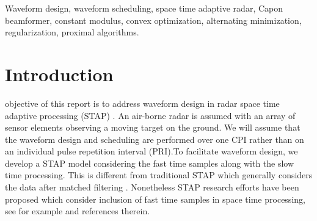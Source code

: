 \documentclass[11pt,draftclsnofoot,onecolumn]{IEEEtran}
\theoremstyle{definition}
\theoremstyle{remark}
\begin{document}
\begin{IEEEkeywords}
Waveform design, waveform scheduling, space time adaptive radar, Capon beamformer, constant modulus, convex optimization, alternating minimization, regularization, proximal algorithms.
\end{IEEEkeywords}



\IEEEpeerreviewmaketitle



\section{Introduction}





 objective of this report is to address waveform design in radar space time adaptive processing (STAP) \cite{klemm2002,ward1994,guerci2003,Brennan1973}. An air-borne radar is assumed with an array of sensor elements observing a moving target on the ground. We will assume that the waveform design and scheduling are performed over one CPI rather than on an individual pulse repetition interval (PRI).To facilitate waveform design, we develop a STAP model considering the fast time samples along with the slow time processing. This is different from traditional STAP which generally considers the data after matched filtering \cite{klemm2002,ward1994}. Nonetheless STAP research efforts have been proposed which consider inclusion of fast time samples in space time processing, see for example \cite{klemm2002,madurasinghe2006,seliktar2006} and references therein.
\end{document}
